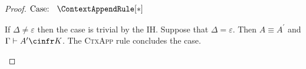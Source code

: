 \begin{proof}
    $\text{Case: }\begin{array}{c} \ContextAppendRule[*] \end{array}$
    \begin{proofcase}
        If $\Delta \neq \varepsilon$ then the case is trivial by the IH.
        Suppose that $\Delta = \varepsilon$.
        Then $A \equiv A^\prime$ and $\Gamma \vdash A^\prime \cinfr K$.
        The \textsc{CtxApp} rule concludes the case.
    \end{proofcase}
\end{proof}











